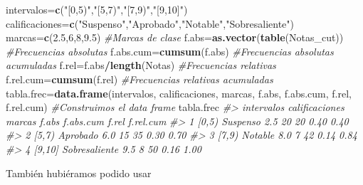 \documentclass[
]{book}
\newenvironment{Shaded}{\begin{snugshade}}{\end{snugshade}}
\newcommand{\CommentTok}[1]{\textcolor[rgb]{0.56,0.35,0.01}{\textit{#1}}}
\newcommand{\DataTypeTok}[1]{\textcolor[rgb]{0.13,0.29,0.53}{#1}}
\newcommand{\DecValTok}[1]{\textcolor[rgb]{0.00,0.00,0.81}{#1}}
\newcommand{\FloatTok}[1]{\textcolor[rgb]{0.00,0.00,0.81}{#1}}
\newcommand{\KeywordTok}[1]{\textcolor[rgb]{0.13,0.29,0.53}{\textbf{#1}}}
\newcommand{\NormalTok}[1]{#1}
\newcommand{\OperatorTok}[1]{\textcolor[rgb]{0.81,0.36,0.00}{\textbf{#1}}}
\newcommand{\OtherTok}[1]{\textcolor[rgb]{0.56,0.35,0.01}{#1}}
\newcommand{\StringTok}[1]{\textcolor[rgb]{0.31,0.60,0.02}{#1}}
\theoremstyle{definition}
\theoremstyle{definition}
\theoremstyle{definition}
\theoremstyle{remark}
\begin{document}
\begin{Shaded}
\begin{Highlighting}[]
\NormalTok{intervalos=}\KeywordTok{c}\NormalTok{(}\StringTok{"[0,5)"}\NormalTok{,}\StringTok{"[5,7)"}\NormalTok{,}\StringTok{"[7,9)"}\NormalTok{,}\StringTok{"[9,10]"}\NormalTok{)}
\NormalTok{calificaciones=}\KeywordTok{c}\NormalTok{(}\StringTok{"Suspenso"}\NormalTok{,}\StringTok{"Aprobado"}\NormalTok{,}\StringTok{"Notable"}\NormalTok{,}\StringTok{"Sobresaliente"}\NormalTok{)}
\NormalTok{marcas=}\KeywordTok{c}\NormalTok{(}\FloatTok{2.5}\NormalTok{,}\DecValTok{6}\NormalTok{,}\DecValTok{8}\NormalTok{,}\FloatTok{9.5}\NormalTok{) }\CommentTok{\#Marcas de clase}
\NormalTok{f.abs=}\KeywordTok{as.vector}\NormalTok{(}\KeywordTok{table}\NormalTok{(Notas\_cut)) }\CommentTok{\#Frecuencias absolutas}
\NormalTok{f.abs.cum=}\KeywordTok{cumsum}\NormalTok{(f.abs)  }\CommentTok{\#Frecuencias absolutas acumuladas}
\NormalTok{f.rel=f.abs}\OperatorTok{/}\KeywordTok{length}\NormalTok{(Notas) }\CommentTok{\#Frecuencias relativas}
\NormalTok{f.rel.cum=}\KeywordTok{cumsum}\NormalTok{(f.rel) }\CommentTok{\#Frecuencias relativas acumuladas}
\NormalTok{tabla.frec=}\KeywordTok{data.frame}\NormalTok{(intervalos, calificaciones, marcas, f.abs, }
\NormalTok{   f.abs.cum, f.rel, f.rel.cum)  }\CommentTok{\#Construimos el data frame}
\NormalTok{tabla.frec}
\CommentTok{\#\textgreater{}   intervalos calificaciones marcas f.abs f.abs.cum f.rel f.rel.cum}
\CommentTok{\#\textgreater{} 1      [0,5)       Suspenso    2.5    20        20  0.40      0.40}
\CommentTok{\#\textgreater{} 2      [5,7)       Aprobado    6.0    15        35  0.30      0.70}
\CommentTok{\#\textgreater{} 3      [7,9)        Notable    8.0     7        42  0.14      0.84}
\CommentTok{\#\textgreater{} 4     [9,10]  Sobresaliente    9.5     8        50  0.16      1.00}
\end{Highlighting}
\end{Shaded}

También hubiéramos podido usar

\begin{Shaded}
\end{Shaded}
\end{document}
